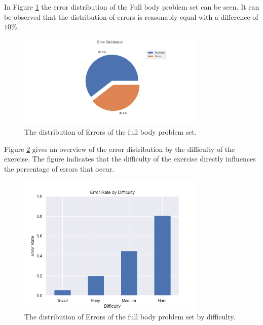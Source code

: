In Figure \ref{fig:fb_pie} the error distribution of the Full body problem set can be seen. It can be observed that the distribution of errors is reasonably equal with a difference of $10\%$. 

\begin{figure}
  \centering
  \includegraphics[width=0.8\textwidth]{figures/Data/dist_full_body/Error_Distribution_by_Body_Half.png}
  \caption[Error Distribution of the Full Body]{The distribution of Errors of the full body problem set.}
  \label{fig:fb_pie}
\end{figure}

Figure \ref{fig:fb_diff_dist} gives an overview of the error distribution by the difficulty of the exercise. The figure indicates that the difficulty of the exercise directly influences the percentage of errors that occur.

\begin{figure}
  \centering
  \includegraphics[width=0.8\textwidth]{figures/Data/dist_full_body/Error_Rate_by_Difficulty.png}
  \caption[Error Distribution of the Full Body by difficulty]{The distribution of Errors of the full body problem set by difficulty.}
  \label{fig:fb_diff_dist}
\end{figure}


